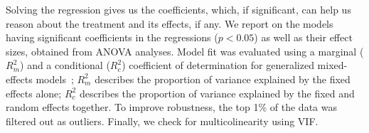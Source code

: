 Solving the regression gives us the coefficients, which, if significant, can help 
us reason about the treatment and its effects, if any.
We report on the models having significant coefficients in the regressions 
($p < 0.05$) as well as their effect sizes, obtained from ANOVA analyses.
Model fit was evaluated using a marginal ($R^2_m$) and a conditional ($R^2_c$) 
coefficient of determination for generalized mixed-effects 
models~\cite{nakagawa2013general, johnson2014extension}; $R^2_m$ describes 
the proportion of variance explained by the fixed effects alone; $R^2_c$ describes 
the proportion of variance explained by the fixed and random effects together.
To improve robustness, the top 1\% of the data was filtered out as outliers.
Finally, we check for multicolinearity using VIF.





